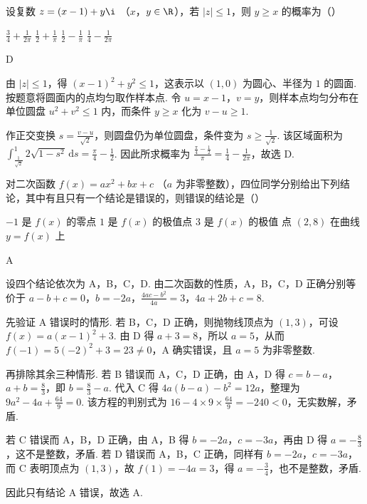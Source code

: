 \begin{problem}
设复数 \(z = (x - 1) + y\i\) （\(x\)，\(y \in \R\)），若 \(|z| \leqslant 1\)，则 \(y \geqslant x\) 的概率为（\quad）

\choices
    {\(\frac{3}{4} + \frac{1}{2\pi}\)}
    {\(\frac{1}{2} + \frac{1}{\pi}\)}
    {\(\frac{1}{2} - \frac{1}{\pi}\)}
    {\(\frac{1}{4} - \frac{1}{2\pi}\)}
\end{problem}

\begin{answer}
D
\end{answer}

\begin{solution}
由 \(|z|\leqslant1\)，得
\((x-1)^{2}+y^{2}\leqslant1\)，这表示以 \((1,0)\) 为圆心、半径为 \(1\) 的圆面. 按题意将圆面内的点均匀取作样本点. 令
\(u=x-1\)，\(v=y\)，则样本点均匀分布在单位圆盘 \(u^{2}+v^{2}\leqslant1\) 内，而条件 \(y\geqslant x\) 化为 \(v-u\geqslant1\).

作正交变换 \(s=\frac{v-u}{\sqrt{2}}\)，则圆盘仍为单位圆盘，条件变为 \(s\geqslant\frac{1}{\sqrt{2}}\). 该区域面积为
\(\displaystyle\int_{\frac{1}{\sqrt{2}}}^{1}2\sqrt{1-s^{2}}\,\mathrm{d}s=\frac{\pi}{4}-\frac{1}{2}\).
因此所求概率为
\(\frac{\frac{\pi}{4}-\frac{1}{2}}{\pi}=\frac{1}{4}-\frac{1}{2\pi}\)，故选 D.
\end{solution}

\begin{problem}
对二次函数 \( f(x) = ax^2 + bx + c \) （\( a \) 为非零整数），四位同学分别给出下列结论，其中有且只有一个结论是错误的，则错误的结论是（\quad）

\choices
    {\(-1\) 是 \(f(x)\) 的零点}
    {\(1\) 是 \(f(x)\) 的极值点}
    {\(3\) 是 \(f(x)\) 的极值}
    {点 \((2,8)\) 在曲线 \( y = f(x) \) 上}
\end{problem}

\begin{answer}
A
\end{answer}

\begin{solution}
设四个结论依次为 A，B，C，D. 由二次函数的性质，A，B，C，D 正确分别等价于
\(a-b+c=0\)，\(b=-2a\)，\(\frac{4ac-b^{2}}{4a}=3\)，\(4a+2b+c=8\).

先验证 A 错误时的情形. 若 B，C，D 正确，则抛物线顶点为 \((1,3)\)，可设 \(f(x)=a(x-1)^{2}+3\). 由 D 得 \(a+3=8\)，所以 \(a=5\)，从而 \(f(-1)=5(-2)^{2}+3=23\ne0\)，A 确实错误，且 \(a=5\) 为非零整数.

再排除其余三种情形. 若 B 错误而 A，C，D 正确，由 A，D 得 \(c=b-a\)，\(a+b=\frac{8}{3}\)，即 \(b=\frac{8}{3}-a\). 代入 C 得 \(4a(b-a)-b^{2}=12a\)，整理为 \(9a^{2}-4a+\frac{64}{9}=0\). 该方程的判别式为 \(16-4\times9\times\frac{64}{9}=-240<0\)，无实数解，矛盾.

若 C 错误而 A，B，D 正确，由 A，B 得 \(b=-2a\)，\(c=-3a\)，再由 D 得 \(a=-\frac{8}{3}\)，这不是整数，矛盾. 若 D 错误而 A，B，C 正确，同样有 \(b=-2a\)，\(c=-3a\)，而 C 表明顶点为 \((1,3)\)，故 \(f(1)=-4a=3\)，得 \(a=-\frac{3}{4}\)，也不是整数，矛盾.

因此只有结论 A 错误，故选 A.
\end{solution}

